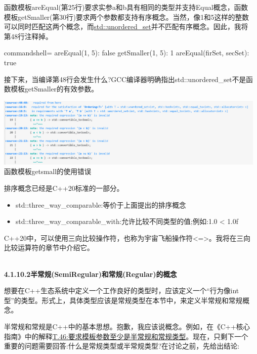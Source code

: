 函数模板areEqual(第25行)要求实参a和b具有相同的类型并支持Equal概念，函数模板getSmaller(第30行)要求两个参数都支持有序概念。当然，像1和5这样的整数可以同时匹配这两个概念，而\href{https://en.cppreference.com/w/cpp/container/unordered_set}{std::unordered\_set}并不匹配有序概念。因此，我将第48行注释掉。

\begin{tcblisting}{commandshell={}}
areEqual(1, 5): false
getSmaller(1, 5): 1
areEqual(firSet, secSet): true
\end{tcblisting}

接下来，当编译第48行会发生什么?GCC编译器明确指出std::unordered\_set不是函数模板getSmaller的有效参数。

\begin{center}
\includegraphics[width=1.0\textwidth]{content/3/chapter4/images/1-5.png}\\
函数模板getsmall的使用错误
\end{center}

排序概念已经是C++20标准的一部分。

\begin{itemize}
\item
std::three\_way\_comparable:等价于上面提出的排序概念

\item
std::three\_way\_comparable\_with:允许比较不同类型的值;例如:1.0 < 1.0f
\end{itemize}

C++20中，可以使用三向比较操作符，也称为宇宙飞船操作符<=>。我将在三向比较运算符的章节中介绍它。

\hspace*{\fill} \\ %
\noindent
\textbf{4.1.10.2\hspace{0.2cm}半常规(SemiRegular)和常规(Regular)的概念}

想要在C++生态系统中定义一个工作良好的类型时，应该定义一个“行为像int型”的类型。形式上，具体类型应该是常规类型在本节中，来定义半常规和常规概念。

半常规和常规是C++中的基本思想。抱歉，我应该说概念。例如，在《C++核心指南》中的解释\href{http://isocpp.github.io/CppCoreGuidelines/CppCoreGuidelines#Rt-regular}{T.46:要求模板参数至少是半常规和常规类型}。现在，只剩下一个重要的问题需要回答:什么是常规类型或半常规类型?在讨论之前，先给出结论:


